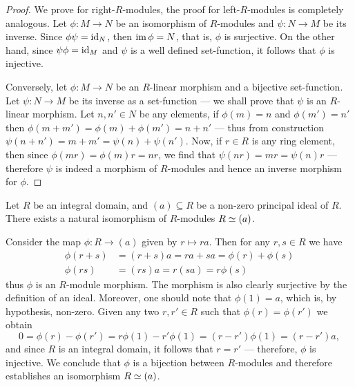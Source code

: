 \begin{proof}
    We prove for right-\(R\)-modules, the proof for left-\(R\)-modules is completely
    analogous. Let \(\phi: M \to N\) be an isomorphism of \(R\)-modules and
    \(\psi: N \to M\) be its inverse. Since \(\phi \psi = \operatorname{id}_N\), then
    \(\operatorname{im} \phi = N\), that is, \(\phi\) is surjective. On the other hand, since
    \(\psi \phi = \operatorname{id}_M\) and \(\psi\) is a well defined set-function, it follows
    that \(\phi\) is injective.

    Conversely, let \(\phi: M \to N\) be an \(R\)-linear morphism and a bijective
    set-function. Let \(\psi: N \to M\) be its inverse as a set-function --- we
    shall prove that \(\psi\) is an \(R\)-linear morphism. Let \(n, n' \in N\) be any
    elements, if \(\phi(m) = n\) and \(\phi(m') = n'\) then
    \(\phi(m + m') = \phi(m) + \phi(m') = n + n'\) --- thus from construction
    \(\psi(n + n') = m + m' = \psi(n) + \psi(n')\). Now, if \(r \in R\) is any ring
    element, then since \(\phi(m r) = \phi(m) r = n r\), we find that
    \(\psi(n r) = m r = \psi(n) r\) --- therefore \(\psi\) is indeed a morphism of
    \(R\)-modules and hence an inverse morphism for \(\phi\).
\end{proof}

\begin{example}
    \label{exp:int-dom-iso-principal-ideal-R-mod}
    Let \(R\) be an integral domain, and \((a) \subseteq R\) be a non-zero principal
    ideal of \(R\). There exists a natural isomorphism of \(R\)-modules
    \(R \simeq (a)\).

    Consider the map \(\phi: R \to (a)\) given by \(r \mapsto r a\). Then for any
    \(r, s \in R\) we have
    \begin{align*}
        \phi(r + s) & = (r + s) a = r a + s a = \phi(r) + \phi(s) \\
        \phi(r s)   & = (r s) a = r (s a) = r \phi(s)
    \end{align*}
    thus \(\phi\) is an \(R\)-module morphism. The morphism is also clearly
    surjective by the definition of an ideal. Moreover, one should note that
    \(\phi(1) = a\), which is, by hypothesis, non-zero. Given any two
    \(r, r' \in R\) such that \(\phi(r) = \phi(r')\) we obtain
    \[
        0 = \phi(r) - \phi(r') = r \phi(1) - r' \phi(1) = (r - r') \phi(1)
        = (r - r') a,
    \]
    and since \(R\) is an integral domain, it follows that \(r = r'\) --- therefore,
    \(\phi\) is injective. We conclude that \(\phi\) is a bijection between
    \(R\)-modules and therefore establishes an isomorphism \(R \simeq (a)\).
\end{example}

